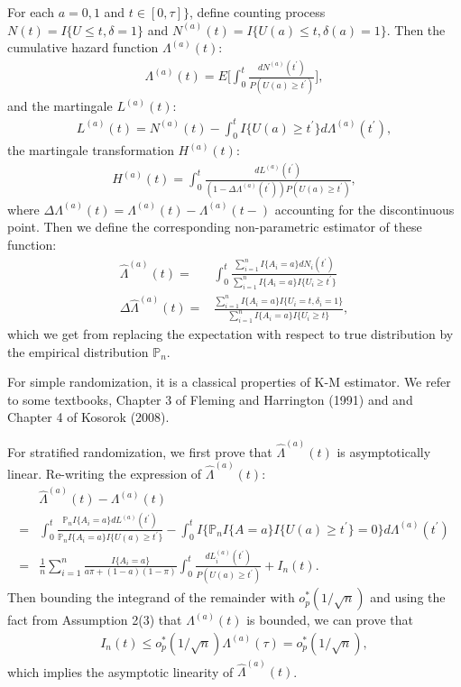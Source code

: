 \documentclass{article}
\begin{document}
For each $a=0,1$ and $t\in [0,\tau]\}$, define counting process $N(t) = I\{U\leq t,\delta=1\}$ and $N^{(a)}(t) = I\{U(a)\leq t,\delta(a)=1\}$.
Then the cumulative hazard function $\Lambda^{(a)}(t)$:
\begin{align}
    \Lambda^{(a)}(t)=E\Big[\int_{0}^{t} \frac{d N^{(a)}(t^{\prime})}{P(U(a)\geq t^{\prime})} \Big],\nonumber
\end{align}
and the martingale $L^{(a)}(t)$:
\begin{align}
    L^{(a)}(t)=N^{(a)}(t)-\int_{0}^{t}I\{U(a)\geq t^{\prime}\} d \Lambda^{(a)}(t^{\prime}),\nonumber
\end{align}
the martingale transformation $H^{(a)}(t)$:
\begin{align}
    H^{(a)}(t)=\int_{0}^{t}\frac{d L^{(a)}(t^{\prime})}{(1-\Delta \Lambda^{(a)}(t^{\prime}))P(U(a)\geq t^{\prime})},\nonumber
\end{align}
where $\Delta \Lambda^{(a)}(t) = \Lambda^{(a)}(t)-\Lambda^{(a)}(t-)$ accounting for the discontinuous point. Then we define the corresponding non-parametric estimator of these function:
\begin{align}\label{sur estimator}
    \hat{\Lambda}^{(a)}(t)=&\int_{0}^{t} \frac{\sum_{i=1}^n I\{A_i=a\}d N_i(t^{\prime})}{\sum_{i=1}^n I\{A_i=a\}I\{U_i\geq t^{\prime}\}}\\
    \Delta\hat{\Lambda}^{(a)}(t)=&\frac{\sum_{i=1}^n I\{A_i=a\}I\{U_i=t,\delta_i=1\}}{\sum_{i=1}^n I\{A_i=a\}I\{U_i\geq t\}},
\end{align}
which we get from replacing the expectation with respect to true distribution by the empirical distribution $\mathbb{P}_n$.



For simple randomization, it is a classical properties of K-M estimator. We refer to some textbooks, Chapter 3 of Fleming and Harrington (1991)\cite{fleming2011counting} and and Chapter 4 of Kosorok (2008)\cite{kosorok2008introduction}.

For stratified randomization, we first prove that $\hat{\Lambda}^{(a)}(t)$ is asymptotically linear. Re-writing the expression of $\hat{\Lambda}^{(a)}(t)$:
\begin{align}
    &\hat{\Lambda}^{(a)}(t)-\Lambda^{(a)}(t)\nonumber\\
    =&\int_{0}^{t} \frac{\mathbb{P}_n I\{A_i=a\}d L^{(a)}(t^{\prime})}{\mathbb{P}_n I\{A_i=a\}I\{U(a)\geq t^{\prime}\}}-\int_{0}^{t}I\{\mathbb{P}_n I\{A=a\}I\{U(a)\geq t^{\prime}\}=0\}d\Lambda^{(a)}(t^{\prime})\nonumber\\
    =& \frac{1}{n}\sum_{i=1}^n \frac{I\{A_i=a\}}{a\pi+(1-a)(1-\pi)}\int_{0}^{t}\frac{d L_{i}^{(a)}(t^{\prime})}{P(U(a)\geq t^{\prime})}+I_n(t).\nonumber
\end{align}
Then bounding the integrand of the remainder with $o_p^{*}(1/\sqrt{n})$ and using the fact from Assumption 2(3) that $\Lambda^{(a)}(t)$ is bounded, we can prove that 
\begin{align}
    I_n(t) \leq  o_p^{*}(1/\sqrt{n}) \Lambda^{(a)}(\tau) =o_p^{*}(1/\sqrt{n}),\nonumber
\end{align}
which implies the asymptotic linearity of $\hat{\Lambda}^{(a)}(t)$.
\end{document}
